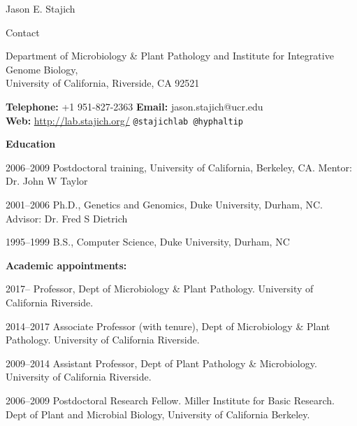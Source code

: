 \documentclass[10pt]{article}
\begin{document}
\begin{cv}{\centerline{Jason E. Stajich}}


\setlength{\cvlabelwidth}{18mm}
\begin{cvlistcompact}{Contact}
\item{Department of Microbiology \& Plant Pathology and Institute for
  Integrative Genome Biology, \\
  University of California, Riverside, CA 92521}
  \item{ \textbf{Telephone:} +1 951-827-2363 \textbf{Email:}
    jason.stajich@ucr.edu \\
    \textbf{Web:} \url{http://lab.stajich.org/} {\tt @stajichlab @hyphaltip}}
\end{cvlistcompact}

\begin{cvlistcompact}{\bf Education}
\item [2006--2009] Postdoctoral training, University of California, Berkeley, CA. Mentor: Dr. John W Taylor
\item [2001--2006] Ph.D., Genetics and Genomics, Duke University, Durham, NC. Advisor: Dr. Fred S Dietrich
\item [1995--1999] B.S., Computer Science, Duke University, Durham, NC
\end{cvlistcompact}

\begin{cvlistcompact}{\bf Academic appointments:}
\item [2017--] Professor, Dept of Microbiology \& Plant Pathology. University of California Riverside.
\item [2014--2017] Associate Professor (with tenure), Dept of Microbiology \& Plant Pathology. University of California Riverside.
\item [2009--2014] Assistant Professor, Dept of Plant Pathology \& Microbiology. University of California Riverside.
\item [2006--2009] Postdoctoral Research Fellow. Miller Institute for Basic Research. \\
  Dept of Plant and Microbial Biology, University of California
  Berkeley. \\
\end{cvlistcompact}


\end{cv}
\end{document}
